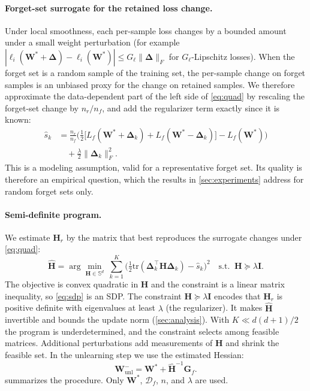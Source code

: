 \documentclass[10pt,twocolumn,letterpaper]{article}
\newcommand{\Hr}{\mathbf{H}_r}
\newcommand{\Hhat}{\widehat{\mathbf{H}}}
\newcommand{\Wstar}{\mathbf{W}^{*}}
\newcommand{\Df}{\mathcal{D}_f}
\begin{document}
\paragraph{Forget-set surrogate for the retained loss change.}
Under local smoothness, each per-sample loss changes by a bounded amount under a small weight perturbation (for example $|\ell_i(\Wstar+\boldsymbol{\Delta})-\ell_i(\Wstar)|\le G_\ell\|\boldsymbol{\Delta}\|_F$ for $G_\ell$-Lipschitz losses). When the forget set is a random sample of the training set, the per-sample change on forget samples is an unbiased proxy for the change on retained samples. We therefore approximate the data-dependent part of the left side of \cref{eq:quad} by rescaling the forget-set change by $n_r/n_f$, and add the regularizer term exactly since it is known:
\begin{equation}
\begin{aligned}
  \hat{s}_k &= \tfrac{n_r}{n_f}\Big(\tfrac12\big[L_f(\Wstar{+}\boldsymbol{\Delta}_k)+L_f(\Wstar{-}\boldsymbol{\Delta}_k)\big]-L_f(\Wstar)\Big)\\
  &\quad+\tfrac{\lambda}{2}\|\boldsymbol{\Delta}_k\|_F^2 .
\end{aligned}
\label{eq:surrogate}
\end{equation}
This is a modeling assumption, valid for a representative forget set. Its quality is therefore an empirical question, which the results in \cref{sec:experiments} address for random forget sets only.

\paragraph{Semi-definite program.}
We estimate $\Hr$ by the matrix that best reproduces the surrogate changes under \cref{eq:quad}:
\begin{equation}
  \Hhat=\arg\min_{\mathbf{H}\in\mathbb{S}^{d}}\ \sum_{k=1}^{K}\Big(\tfrac12\mathrm{tr}(\boldsymbol{\Delta}_k^\top\mathbf{H}\boldsymbol{\Delta}_k)-\hat{s}_k\Big)^{2}\quad\text{s.t. }\ \mathbf{H}\succeq\lambda\mathbf{I}.
  \label{eq:sdp}
\end{equation}
The objective is convex quadratic in $\mathbf{H}$ and the constraint is a linear matrix inequality, so \cref{eq:sdp} is an SDP. The constraint $\mathbf{H}\succeq\lambda\mathbf{I}$ encodes that $\Hr$ is positive definite with eigenvalues at least $\lambda$ (the regularizer). It makes $\Hhat$ invertible and bounds the update norm (\cref{sec:analysis}). With $K\ll d(d+1)/2$ the program is underdetermined, and the constraint selects among feasible matrices. Additional perturbations add measurements of $\mathbf{H}$ and shrink the feasible set. In the unlearning step we use the estimated Hessian:
\begin{equation}
  \mathbf{W}_{\text{unl}}^{-}=\Wstar+\Hhat^{-1}\mathbf{G}_f .
  \label{eq:srcfree}
\end{equation}
 summarizes the procedure. Only $\Wstar$, $\Df$, $n$, and $\lambda$ are used.
\end{document}
